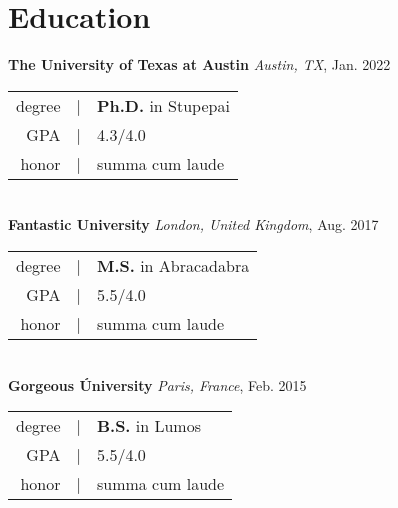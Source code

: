 \pagestyle{CV}

\section*{\textcolor{Burnt Orange}{Education}\hrulefill}
\vspace{-2.4mm}
\textbf{The University of Texas at Austin} \hfill \textit{Austin, TX}, Jan. 2022 \\
\begin{tabular}{rcl}
    degree & \textcolor{Burnt Orange}{|} & \textbf{Ph.D.} in Stupepai \\
    GPA & \textcolor{Burnt Orange}{|} & 4.3/4.0 \\
    honor & \textcolor{Burnt Orange}{|} & summa cum laude
\end{tabular}\\[6pt]
\textbf{Fantastic University} \hfill \textit{London, United Kingdom}, Aug. 2017 \\
\begin{tabular}{rcl}
    degree & \textcolor{Burnt Orange}{|} & \textbf{M.S.} in Abracadabra \\
    GPA & \textcolor{Burnt Orange}{|} & 5.5/4.0 \\
    honor & \textcolor{Burnt Orange}{|} & summa cum laude
\end{tabular}\\[6pt]
\textbf{Gorgeous \'{U}niversity} \hfill \textit{Paris, France}, Feb. 2015 \\
\begin{tabular}{rcl}
    degree & \textcolor{Burnt Orange}{|} & \textbf{B.S.} in Lumos \\
    GPA & \textcolor{Burnt Orange}{|} & 5.5/4.0 \\
    honor & \textcolor{Burnt Orange}{|} & summa cum laude
\end{tabular}
\vspace{-3mm}

